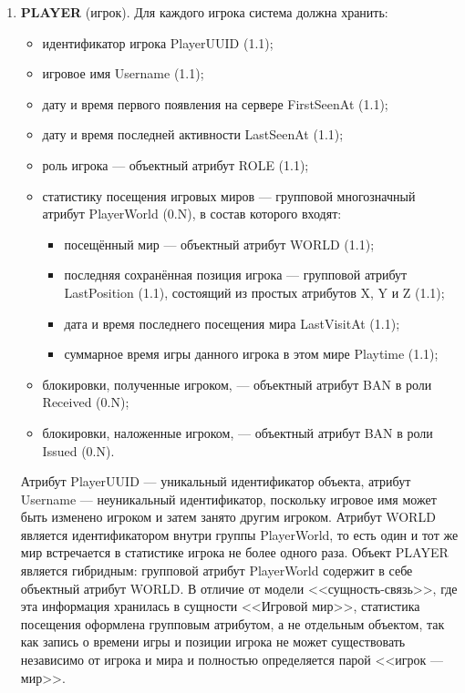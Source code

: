 \documentclass[a4paper, 14pt]{extarticle}
\begin{document}
\begin{enumerate}
    \item \textbf{PLAYER} (игрок). Для каждого игрока система должна хранить:
    \begin{itemize}
        \item идентификатор игрока PlayerUUID (1.1);
        \item игровое имя Username (1.1);
        \item дату и время первого появления на сервере FirstSeenAt (1.1);
        \item дату и время последней активности LastSeenAt (1.1);
        \item роль игрока --- объектный атрибут ROLE (1.1);
        \item статистику посещения игровых миров --- групповой многозначный атрибут PlayerWorld (0.N), в состав которого входят:
        \begin{itemize}
            \item посещённый мир --- объектный атрибут WORLD (1.1);
            \item последняя сохранённая позиция игрока --- групповой атрибут LastPosition (1.1), состоящий из простых атрибутов X, Y и Z (1.1);
            \item дата и время последнего посещения мира LastVisitAt (1.1);
            \item суммарное время игры данного игрока в этом мире Playtime (1.1);
        \end{itemize}
        \item блокировки, полученные игроком, --- объектный атрибут BAN в роли Received (0.N);
        \item блокировки, наложенные игроком, --- объектный атрибут BAN в роли Issued (0.N).
    \end{itemize}
    Атрибут PlayerUUID --- уникальный идентификатор объекта, атрибут Username --- неуникальный идентификатор, поскольку игровое имя может быть изменено игроком и затем занято другим игроком. Атрибут WORLD является идентификатором внутри группы PlayerWorld, то есть один и тот же мир встречается в статистике игрока не более одного раза. Объект PLAYER является гибридным: групповой атрибут PlayerWorld содержит в себе объектный атрибут WORLD. В отличие от модели <<сущность-связь>>, где эта информация хранилась в сущности <<Игровой мир>>, статистика посещения оформлена групповым атрибутом, а не отдельным объектом, так как запись о времени игры и позиции игрока не может существовать независимо от игрока и мира и полностью определяется парой <<игрок --- мир>>.


\end{enumerate}
\end{document}
